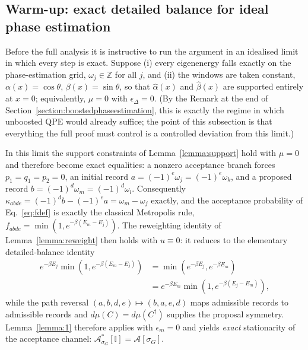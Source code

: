 \documentclass[aps,floatfix,10pt,amssymb,amsfont,amsmath,superscriptaddress,float,nofootinbib,longbibliography,nobalancelastpage,twocolumn]{revtex4-2}
\begin{document}
\subsection{Warm-up: exact detailed balance for ideal phase estimation}
\label{subsec:warmup}
Before the full analysis it is instructive to run the argument in an idealised limit in which every step is exact. Suppose (i) every eigenenergy falls exactly on the phase-estimation grid, $\omega_j \in \mathbb{Z}$ for all $j$, and (ii) the windows are taken constant, $\alpha(x) = \cos\theta$, $\beta(x) = \sin\theta$, so that $\hat\alpha(x)$ and $\hat\beta(x)$ are supported entirely at $x = 0$; equivalently, $\mu = 0$ with $\epsilon_{\Delta} = 0$. (By the Remark at the end of Section~\ref{section:boostedphaseestimation}, this is exactly the regime in which unboosted QPE would already suffice; the point of this subsection is that everything the full proof must control is a controlled deviation from this limit.)

In this limit the support constraints of Lemma~\ref{lemma:support} hold with $\mu = 0$ and therefore become exact equalities: a nonzero acceptance branch forces $p_1 = q_1 = p_2 = 0$, an initial record $a = (-1)^e\omega_j = (-1)^e\omega_k$, and a proposed record $b = (-1)^d\omega_m = (-1)^d\omega_l$. Consequently $\kappa_{abde} = (-1)^db - (-1)^ea = \omega_m - \omega_j$ exactly, and the acceptance probability of Eq.~\eqref{eq:fdef} is exactly the classical Metropolis rule, $f_{abde} = \min(1, e^{-\beta(E_m-E_j)})$. The reweighting identity of Lemma~\ref{lemma:reweight} then holds with $u \equiv 0$: it reduces to the elementary detailed-balance identity
\begin{equation}
\begin{split}
    e^{-\beta E_j}\min(1, e^{-\beta(E_m - E_j)}) &= \min(e^{-\beta E_j}, e^{-\beta E_m}) \\
    &= e^{-\beta E_m}\min(1, e^{-\beta(E_j - E_m)}),
\end{split}
\end{equation}
while the path reversal $(a,b,d,e) \mapsto (b,a,e,d)$ maps admissible records to admissible records and $d\mu(C) = d\mu(C^{\dagger})$ supplies the proposal symmetry. Lemma~\ref{lemma:1} therefore applies with $\epsilon_m = 0$ and yields \emph{exact} stationarity of the acceptance channel: $\mathcal{A}^*_{\sigma_G}[\mathbb{I}] = \mathcal{A}[\sigma_G]$.
\end{document}
